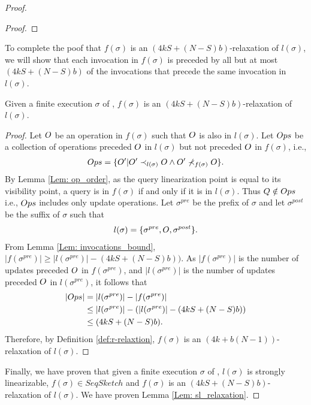 \begin{proof}
\begin{proof}
\end{proof}

To complete the poof that $f(\sigma)$ is an \((4kS + (N-S)b)\)-relaxation of $l(\sigma)$, we will show that each invocation in $f(\sigma)$ is preceded by all but at most \((4kS + (N-S)b)\) of the invocations that precede the same invocation in $l(\sigma)$.

\begin{lemma}\label{Lem: relaxation}
Given a finite execution $\sigma$ of \mysketch, $f(\sigma)$ is an \((4kS + (N-S)b)\)-relaxation of $l(\sigma)$.
\end{lemma}
\begin{proof}
Let $\mathnormal{O}$ be an operation in $f(\sigma)$ such that $\mathnormal{O}$ is also in $l(\sigma)$. Let $\mathnormal{Ops}$ be a collection of operations preceded $\mathnormal{O}$ in $l(\sigma)$ but not preceded $\mathnormal{O}$ in $f(\sigma)$, i.e.,
\begin{align}
    \mathnormal{Ops}=\{\mathnormal{O}'| \mathnormal{O}' \prec_{l(\sigma)} \mathnormal{O} \wedge  \mathnormal{O}' \nprec_{f(\sigma)} \mathnormal{O} \}.
\end{align}
By Lemma \ref{Lem: op_order}, as the query linearization point is equal to its visibility point, a query is in $f(\sigma)$ if and only if it is in $l(\sigma)$. Thus \( \mathnormal{Q} \notin \mathnormal{Ops} \) i.e., $\mathnormal{Ops}$ includes only update operations. Let \(\sigma^{pre}\) be the prefix of $\sigma$ and let \(\sigma^{post}\) be the suffix of $\sigma$ such that
\begin{align}
 l(\sigma)=\{\sigma^{pre},\mathnormal{O},\sigma^{post}\}.
\end{align}
From Lemma \ref{Lem: invocations_bound}, \(|f(\sigma^{pre})| \ge |l(\sigma^{pre})| - (4kS + (N-S)b))\). As \(|f(\sigma^{pre})|\) is the number of updates preceded $\mathnormal{O}$ in \(f(\sigma^{pre})\), and \(|l(\sigma^{pre})|\) is the number of updates preceded $\mathnormal{O}$ in \(l(\sigma^{pre})\), it follows that
\begin{align}
    |\mathnormal{Ops}| &= |l(\sigma^{pre})|-|f(\sigma^{pre})| \\
                       &\leq |l(\sigma^{pre})|-(|l(\sigma^{pre})| - (4kS + (N-S)b))\\
                       &\leq (4kS + (N-S)b).
\end{align}
Therefore, by Definition \ref{def:r-relaxtion}, $f(\sigma)$ is an \((4k+b(N-1))\)-relaxation of $l(\sigma)$.
\end{proof}

Finally, we have proven that given a finite execution $\sigma$ of \mysketch, $l(\sigma)$ is strongly linearizable, \(f(\sigma) \in SeqSketch\) and $f(\sigma)$ is an \((4kS + (N-S)b)\)-relaxation of $l(\sigma)$. We have proven Lemma \ref{Lem: sl_relaxation}.

\end{proof}
